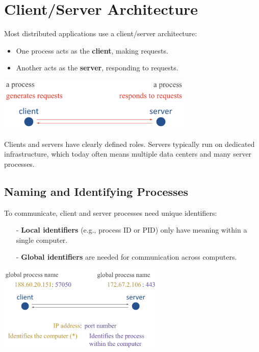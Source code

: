 \documentclass[../../compsys.tex]{subfiles}
\begin{document}
\section{Client/Server Architecture}
Most distributed applications use a client/server architecture:
\begin{itemize}
    \item One process acts as the \textbf{client}, making requests.
    \item Another acts as the \textbf{server}, responding to requests.
\end{itemize}
\begin{center}
    \includegraphics[width=0.7\textwidth]{images/client-server.png}
\end{center}
Clients and servers have clearly defined roles. Servers typically run on dedicated infrastructure, which today often means multiple data centers and many server processes.

\subsection{Naming and Identifying Processes}
To communicate, client and server processes need unique identifiers:
\begin{itemize}
    \item[-] \textbf{Local identifiers} (e.g., process ID or PID) only have meaning within a single computer.
    \item[-] \textbf{Global identifiers} are needed for communication across computers.
\end{itemize}

\begin{center}
    \includegraphics[width=0.6\textwidth]{images/process-view.png}
\end{center}
\end{document}
